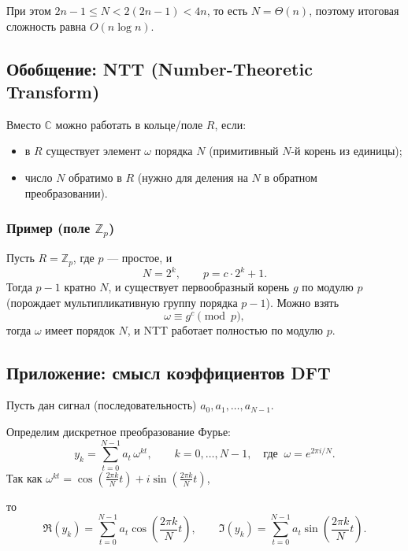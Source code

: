При этом $2n-1 \le N < 2(2n-1) < 4n$, то есть $N=\Theta(n)$, поэтому итоговая сложность равна $O(n\log n)$.

\subsection*{Обобщение: NTT (Number-Theoretic Transform)}

Вместо $\mathbb{C}$ можно работать в кольце/поле $R$, если:
\begin{itemize}
	\item в $R$ существует элемент $\omega$ порядка $N$ (примитивный $N$-й корень из единицы);
	\item число $N$ обратимо в $R$ (нужно для деления на $N$ в обратном преобразовании).
\end{itemize}

\subsubsection*{Пример (поле $\mathbb{Z}_p$)}

Пусть $R=\mathbb{Z}_p$, где $p$ — простое, и
\[
N=2^k,\qquad p=c\cdot 2^k+1.
\]
Тогда $p-1$ кратно $N$, и существует первообразный корень $g$ по модулю $p$
(порождает мультипликативную группу порядка $p-1$).
Можно взять
\[
\omega \equiv g^c \pmod p,
\]
тогда $\omega$ имеет порядок $N$, и NTT работает полностью по модулю $p$.

\subsection*{Приложение: смысл коэффициентов DFT}

Пусть дан сигнал (последовательность) $a_0,a_1,\dots,a_{N-1}.$

Определим дискретное преобразование Фурье:
\[
y_k=\sum_{t=0}^{N-1} a_t\,\omega^{kt},\qquad k=0,\dots,N-1,
\quad \text{где }\ \omega=e^{2\pi i/N}.
\]
Так как $\omega^{kt}=\cos\!\left(\frac{2\pi k}{N}t\right)+
i\sin\!\left(\frac{2\pi k}{N}t\right)$,

то
\[
\Re(y_k)=\sum_{t=0}^{N-1} a_t\cos\!\left(\frac{2\pi k}{N}t\right),
\qquad
\Im(y_k)=\sum_{t=0}^{N-1} a_t\sin\!\left(\frac{2\pi k}{N}t\right).
\]

